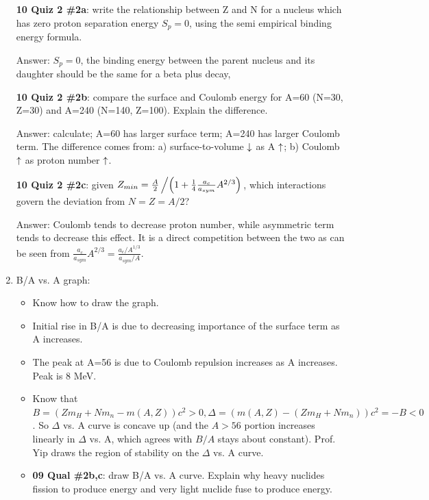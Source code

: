 \documentclass{school-22.101-notes}
\begin{document}
\begin{enumerate}
    \textbf{10 Quiz 2 \#2a}: write the relationship between Z and N for a nucleus which has zero proton separation energy $S_p = 0$, using the semi empirical binding energy formula. 

    Answer: $S_p = 0$, the binding energy between the parent nucleus and its daughter should be the same for a beta plus decay, 

    \textbf{10 Quiz 2 \#2b}: compare the surface and Coulomb energy for A=60 (N=30, Z=30) and A=240 (N=140, Z=100). Explain the difference. 

    Answer: calculate; A=60 has larger surface term; A=240 has larger Coulomb term. The difference comes from: a) surface-to-volume $\downarrow$ as A $\uparrow$; b) Coulomb $\uparrow$ as proton number $\uparrow$. 

    \textbf{10 Quiz 2 \#2c}: given $Z_{min} = \frac{A}{2} \left/ \left( 1 + \frac{1}{4} \frac{a_c}{a_{sym}} A^{2/3} \right) \right.$, which interactions govern the deviation from $N=Z=A/2$? 

    Answer: Coulomb tends to decrease proton number, while asymmetric term tends to decrease this effect. It is a direct competition between the two as can be seen from $\frac{a_c}{a_{sym}} A^{2/3} = \frac{a_c / A^{1/3}}{a_{sym} / A }$. 

\item B/A vs. A graph: 
  \begin{itemize}
  \item Know how to draw the graph. 
  \item Initial rise in B/A is due to decreasing importance of the surface term as A increases. 
  \item The peak at A=56 is due to Coulomb repulsion increases as A increases. Peak is 8 MeV. 
  \item Know that $B = (Zm_H + N m_n - m(A,Z))c^2 > 0, \Delta = (m(A,Z) - (Zm_H + N m_n)) c^2  = - B < 0$. So $\Delta$ vs. A curve is concave up (and the $A>56$ portion increases linearly in $\Delta$ vs. A, which agrees with $B/A$ stays about constant). Prof. Yip draws the region of stability on the $\Delta$ vs. A curve. 
  \item \textbf{09 Qual \#2b,c}: draw B/A vs. A curve. Explain why heavy nuclides fission to produce energy and very light nuclide fuse to produce energy.   
 \end{itemize}


\end{enumerate}
\end{document}
